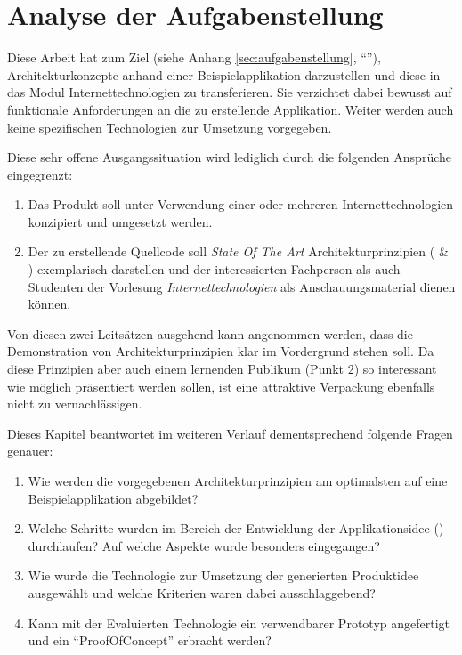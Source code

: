 \chapter{Analyse der Aufgabenstellung}
\label{sec:analyse-der-aufgabenstellung}

Diese Arbeit hat zum Ziel (siehe Anhang \ref{sec:aufgabenstellung},
``''), Architekturkonzepte anhand einer
Beispielapplikation darzustellen und diese in das Modul Internettechnologien
zu transferieren. Sie verzichtet dabei bewusst auf funktionale Anforderungen
an die zu erstellende Applikation. Weiter werden auch keine spezifischen
Technologien zur Umsetzung vorgegeben.

Diese sehr offene Ausgangssituation wird lediglich durch die folgenden
Ansprüche eingegrenzt:

\begin{enumerate}
	\item Das Produkt soll unter Verwendung einer oder mehreren
		Internettechnologien konzipiert und umgesetzt werden.
	\item Der zu erstellende Quellcode soll \emph{State Of The Art}
		Architekturprinzipien (\cite{ROCA} \& \cite{TilkovSlides}) exemplarisch
		darstellen und der interessierten Fachperson als auch Studenten der
		Vorlesung \emph{Internettechnologien} als Anschauungsmaterial dienen können.
\end{enumerate}

Von diesen zwei Leitsätzen ausgehend kann angenommen werden, dass die
Demonstration von Architekturprinzipien klar im Vordergrund stehen soll.
Da diese Prinzipien aber auch einem lernenden Publikum (Punkt 2) so
interessant wie möglich präsentiert werden sollen, ist eine attraktive
Verpackung ebenfalls nicht zu vernachlässigen.

Dieses Kapitel beantwortet im weiteren Verlauf dementsprechend folgende Fragen genauer:

\begin{enumerate}
	\item Wie werden die vorgegebenen Architekturprinzipien am optimalsten
		auf eine Beispielapplikation abgebildet?
	\item Welche Schritte wurden im Bereich der Entwicklung der
		Applikationsidee ()
		durchlaufen? Auf welche Aspekte wurde besonders eingegangen?
	\item Wie wurde die Technologie zur Umsetzung der generierten
		Produktidee ausgewählt und welche Kriterien waren dabei ausschlaggebend?
	\item Kann mit der Evaluierten Technologie ein verwendbarer
		Prototyp angefertigt und ein ``\gls{ProofOfConcept}'' erbracht werden?
\end{enumerate}

\newpage


\newpage


\newpage


\newpage

